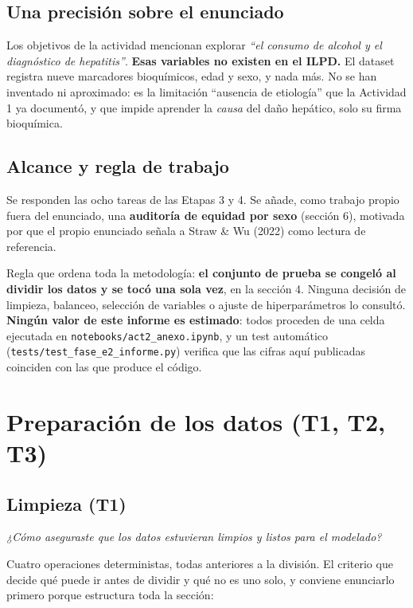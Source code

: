 \documentclass[10pt,a4paper]{article}
\begin{document}
\subsection{Una precisión sobre el enunciado}

Los objetivos de la actividad mencionan explorar \textit{``el consumo de alcohol y el diagnóstico de hepatitis''}. \textbf{Esas variables no existen en el ILPD.} El dataset registra nueve marcadores bioquímicos, edad y sexo, y nada más. No se han inventado ni aproximado: es la limitación ``ausencia de etiología'' que la Actividad 1 ya documentó, y que impide aprender la \textit{causa} del daño hepático, solo su firma bioquímica.

\subsection{Alcance y regla de trabajo}

Se responden las ocho tareas de las Etapas 3 y 4. Se añade, como trabajo propio fuera del enunciado, una \textbf{auditoría de equidad por sexo} (sección 6), motivada por que el propio enunciado señala a Straw \& Wu (2022) como lectura de referencia.

Regla que ordena toda la metodología: \textbf{el conjunto de prueba se congeló al dividir los datos y se tocó una sola vez}, en la sección 4. Ninguna decisión de limpieza, balanceo, selección de variables o ajuste de hiperparámetros lo consultó. \textbf{Ningún valor de este informe es estimado}: todos proceden de una celda ejecutada en \texttt{notebooks/act2\_anexo.ipynb}, y un test automático (\texttt{tests/test\_fase\_e2\_informe.py}) verifica que las cifras aquí publicadas coinciden con las que produce el código.

\section{Preparación de los datos (T1, T2, T3)}

\subsection{Limpieza (T1)}

\textit{¿Cómo aseguraste que los datos estuvieran limpios y listos para el modelado?}

Cuatro operaciones deterministas, todas anteriores a la división. El criterio que decide qué puede ir antes de dividir y qué no es uno solo, y conviene enunciarlo primero porque estructura toda la sección:
\end{document}
